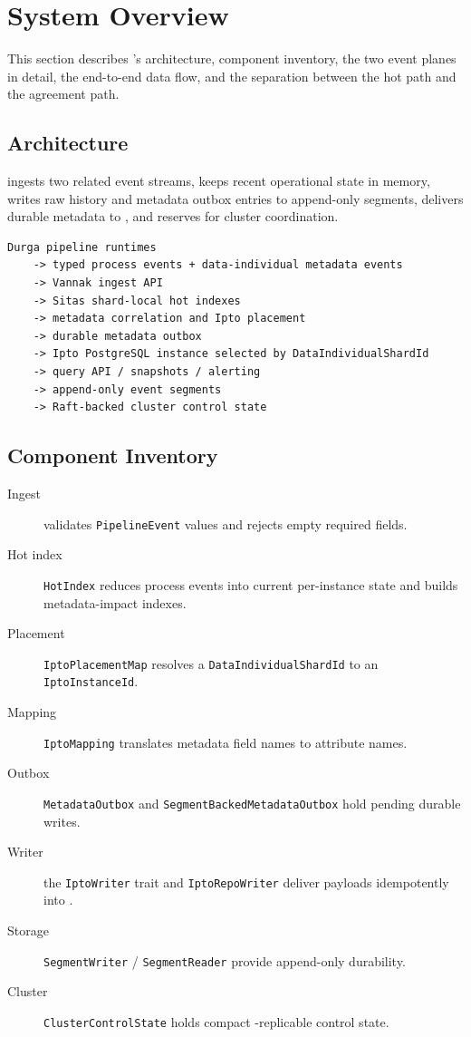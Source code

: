 \section{System Overview}
\label{sec:system-overview}

This section describes \vannak{}'s architecture, component inventory, the two
event planes in detail, the end-to-end data flow, and the separation between
the hot path and the agreement path.

\subsection{Architecture}

\vannak{} ingests two related event streams, keeps recent operational state in
memory, writes raw history and metadata outbox entries to append-only segments,
delivers durable metadata to \ipto{}, and reserves \raft{} for cluster
coordination.

\begin{lstlisting}[numbers=none]
Durga pipeline runtimes
    -> typed process events + data-individual metadata events
    -> Vannak ingest API
    -> Sitas shard-local hot indexes
    -> metadata correlation and Ipto placement
    -> durable metadata outbox
    -> Ipto PostgreSQL instance selected by DataIndividualShardId
    -> query API / snapshots / alerting
    -> append-only event segments
    -> Raft-backed cluster control state
\end{lstlisting}

\subsection{Component Inventory}

\begin{description}
\item[Ingest] validates \texttt{PipelineEvent} values and rejects empty
  required fields.
\item[Hot index] \texttt{HotIndex} reduces process events into current
  per-instance state and builds metadata-impact indexes.
\item[Placement] \texttt{IptoPlacementMap} resolves a
  \texttt{DataIndividualShardId} to an \texttt{IptoInstanceId}.
\item[Mapping] \texttt{IptoMapping} translates metadata field names to \ipto{}
  attribute names.
\item[Outbox] \texttt{MetadataOutbox} and \texttt{SegmentBackedMetadataOutbox}
  hold pending durable writes.
\item[Writer] the \texttt{IptoWriter} trait and \texttt{IptoRepoWriter}
  deliver payloads idempotently into \ipto{}.
\item[Storage] \texttt{SegmentWriter} / \texttt{SegmentReader} provide
  append-only durability.
\item[Cluster] \texttt{ClusterControlState} holds compact \raft{}-replicable
  control state.
\end{description}

